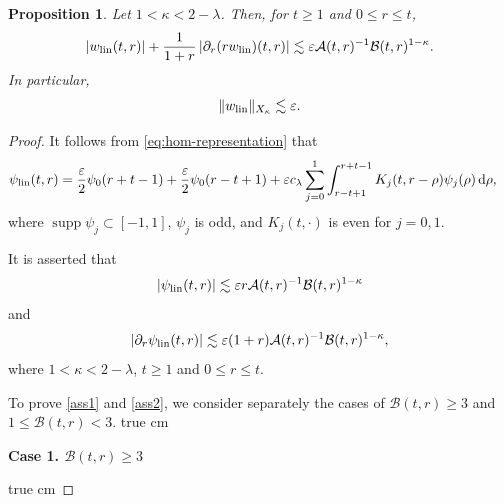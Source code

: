 \documentclass[11pt,twoside]{article}
\newcommand{\supp}{\operatorname{supp}}
\newcommand{\p}{\partial}
\newcommand{\ve}{\varepsilon}
\newcommand{\f}{\frac}
\newcommand{\Acal}{\mathcal A}
\newcommand{\Bcal}{\mathcal B}
\newcommand{\dd}{\,\mathrm{d}}
\theoremstyle{plain}
\newtheorem{proposition}{Proposition}[section]
\theoremstyle{definition}
\theoremstyle{remark}
\numberwithin{equation}{section}
\begin{document}
\begin{proposition}
\label{prop:linear}
Let $1<\kappa<2-\lambda$. Then, for $t\geq1$ and $0\leq r\leq t$,
\begin{equation}
\label{eq:linear-weighted}
|w_{\rm lin}(t,r)|
+\f{1}{1+r}
\left|
\p_r(rw_{\rm lin})(t,r)
\right|
\lesssim
\ve\Acal(t,r)^{-1}\Bcal(t,r)^{1-\kappa}.
\end{equation}
In particular,
\begin{equation}\label{QQ-29}
\|w_{\rm lin}\|_{X_\kappa}\lesssim\ve.
\end{equation}
\end{proposition}
\begin{proof}
It follows from \eqref{eq:hom-representation} that
\begin{equation}\label{QQ-29'}
\begin{aligned}
\psi_{\rm lin}(t,r)
={}&
\f{\ve}{2}\psi_0(r+t-1)
+\f{\ve}{2}\psi_0(r-t+1)+
\ve c_\lambda
\sum_{j=0}^1
\int_{r-t+1}^{r+t-1}
K_j(t,r-\rho)\psi_j(\rho)\dd\rho,
\end{aligned}
\end{equation}
where $\supp\psi_j\subset[-1,1]$, $\psi_j$ is odd, and
$K_j(t,\cdot)$ is even for $j=0,1$.

It is asserted that
\begin{equation}\label{ass1}
|\psi_{\rm lin}(t,r)|
\lesssim
\ve r\Acal(t,r)^{-1}\Bcal(t,r)^{1-\kappa}
\end{equation}
and
\begin{equation}\label{ass2}
|\p_r\psi_{\rm lin}(t,r)|
\lesssim
\ve(1+r)\Acal(t,r)^{-1}\Bcal(t,r)^{1-\kappa},
\end{equation}
where $1<\kappa<2-\lambda$,  $t\geq1$ and $0\leq r\leq t$.

To prove \eqref{ass1} and \eqref{ass2}, we consider separately the
cases of $\Bcal(t,r)\geq3$ and $1\leq\Bcal(t,r)<3$.
 true cm

{\bf Case 1.  $\Bcal(t,r)\geq3$ }

 true cm


\end{proof}
\end{document}
